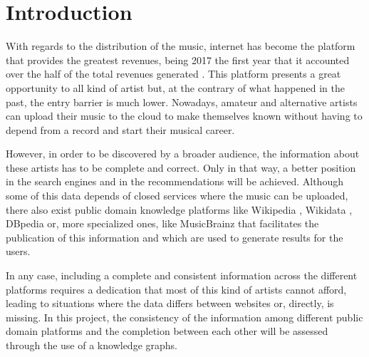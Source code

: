 \section{Introduction}
With regards to the distribution of the music, internet has become the platform that provides the greatest revenues, being 2017 the first year that it accounted over the half of the total revenues generated \citep{music_report_2018}.
This platform presents a great opportunity to all kind of artist but, at the contrary of what happened in the past, the entry barrier is much lower.
Nowadays, amateur and alternative artists can upload their music to the cloud to make themselves known without having to depend from a record and start their musical career. 

However, in order to be discovered by a broader audience, the information about these artists has to be complete and correct.
Only in that way, a better position in the search engines and in the recommendations will be achieved.
Although some of this data depends of closed services where the music can be uploaded, there also exist public domain knowledge platforms like Wikipedia \citep{wikipedia}, Wikidata \citep{wikidata}, DBpedia \citep{dbpedia} or, more specialized ones, like MusicBrainz \citep{musicbrainz} that facilitates the publication of this information and which are used to generate results for the users. 

In any case, including a complete and consistent information across the different platforms requires a dedication that most of this kind of artists cannot afford, leading to situations where the data differs between websites or, directly, is missing. 
In this project, the consistency of the information among different public domain platforms and the completion between each other will be assessed through the use of a knowledge graphs. 